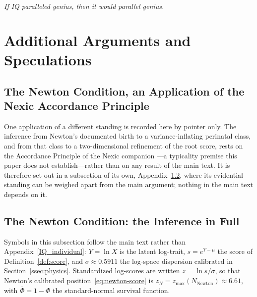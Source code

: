 \documentclass{article}
\begin{document}
\begin{center}
\emph{If IQ paralleled genius, then it would parallel genius.}
\end{center}

\section{Additional Arguments and Speculations}

\subsection{The Newton Condition, an Application of the Nexic Accordance Principle}\label{app:newton}

One application of a different standing is recorded here by pointer only. The inference from Newton's documented birth to a variance-inflating perinatal class, and from that class to a two-dimensional refinement of the root score, rests on the Accordance Principle of the Nexic companion \cite{NexicFoundation}---a typicality premise this paper does not establish---rather than on any result of the main text. It is therefore set out in a subsection of its own, Appendix~\ref{app:newton-full}, where its evidential standing can be weighed apart from the main argument; nothing in the main text depends on it.
\subsection{The Newton Condition: the Inference in Full}\label{app:newton-full}

\noindent Symbols in this subsection follow the main text rather than Appendix~\ref{IQ_individual}: $Y = \ln X$ is the latent log-trait, $s = e^{Y-\mu}$ the score of Definition~\ref{def:score}, and $\sigma \approx 0.5911$ the log-space dispersion calibrated in Section~\ref{ssec:physics}. Standardized log-scores are written $z = \ln s/\sigma$, so that Newton's calibrated position~\eqref{eq:newton-score} is $z_N = z_{\max}(N_{\mathrm{Newton}}) \approx 6.61$, with $\bar\Phi = 1 - \Phi$ the standard-normal survival function.
\end{document}
